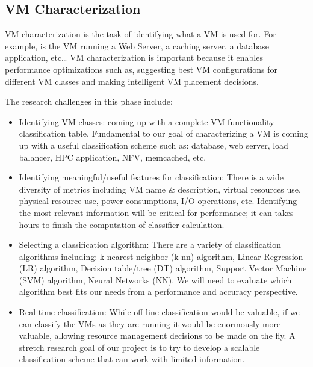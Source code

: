 \subsection{VM Characterization}
VM characterization is the task of identifying what a VM is used for. For example, is the VM running a Web Server, a caching server, a database application, etc… VM characterization is important because it enables performance optimizations such as, suggesting best VM configurations for different VM classes and making intelligent VM placement decisions. 

The research challenges in this phase include:
\begin{itemize}
\item Identifying VM classes: coming up with a complete VM functionality classification table. Fundamental to our goal of characterizing a VM is coming up with a useful classification scheme such as: database, web server, load balancer, HPC application, NFV, memcached, etc.  

\item Identifying meaningful/useful features for classification: There is a wide diversity of metrics including VM name \& description, virtual resources use, physical resource use, power consumptions, I/O operations, etc.  Identifying the most relevant information will be critical for performance; it can takes hours to finish the computation of classifier calculation. 

\item Selecting a classification algorithm: There are a variety of classification algorithms including: k-nearest neighbor (k-nn) algorithm, Linear Regression (LR) algorithm, Decision table/tree (DT) algorithm, Support Vector Machine (SVM) algorithm, Neural Networks (NN). We will need to evaluate which algorithm best fits our needs from a performance and accuracy perspective. 

\item Real-time classification: While off-line classification would be valuable, if we can classify the VMs as they are running it would be enormously more valuable, allowing resource management decisions to be made on the fly.  A stretch research goal of our project is to try to develop a scalable classification scheme that can work with limited information. 

\end{itemize}
